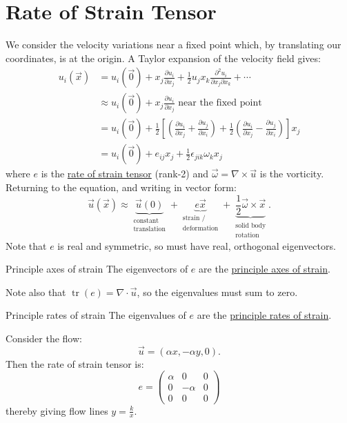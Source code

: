\documentclass[../Main.tex]{subfiles}
\begin{document}
\section{Rate of Strain Tensor}
We consider the velocity variations near a fixed point which, by translating our coordinates, is at the origin. A Taylor expansion of the velocity field gives:
\begin{align*}
    u_i(\vec{x}) &= u_i(\vec0) + x_j \frac{\partial u_i}{\partial x_j} + \frac12 u_j x_k \frac{\partial^{2}u_i}{\partial x_j\partial x_k} + \cdots \\
    &\approx u_i(\vec0) + x_j \frac{\partial u_i}{\partial x_j} \text{ near the fixed point} \\
    &= u_i(\vec0) + \frac12 \left[\left(\frac{\partial u_i}{\partial x_j} + \frac{\partial u_j}{\partial x_i}\right) + \frac12 \left(\frac{\partial u_i}{\partial x_j} - \frac{\partial u_j}{\partial x_i}\right)\right] x_j \\
    &= u_i(\vec0) + e_{ij}x_j + \frac12 \epsilon_{jik} \omega_k x_j
\end{align*}
where $e$ is the \underline{rate of strain tensor} (rank-2) and $\vec{\omega} = \nabla \times \vec{u}$ is the vorticity. Returning to the equation, and writing in vector form:
\begin{equation*}
    \vec{u}(\vec{x}) \approx \underbrace{\vec{u}(0)}_{\substack{\text{constant}\\\text{translation}}} + \underbrace{e \vec{x}}_{\substack{\text{strain /}\\\text{deformation}}} + \underbrace{\frac12 \vec{\omega} \times \vec{x}}_{\substack{\text{solid body}\\\text{rotation}}}.
\end{equation*}
Note that $e$ is real and symmetric, so must have real, orthogonal eigenvectors.
\begin{definition}{Principle axes of strain}
    The eigenvectors of $e$ are the \underline{principle axes of strain}.
\end{definition}
Note also that $\operatorname{tr}(e) = \nabla \cdot \vec{u}$, so the eigenvalues must sum to zero.
\begin{definition}{Principle rates of strain}
    The eigenvalues of $e$ are the \underline{principle rates of strain}.
\end{definition}
\begin{example}
    Consider the flow:
    \begin{equation*}
        \vec{u} = \left(\alpha x, -\alpha y, 0\right).
    \end{equation*}
    Then the rate of strain tensor is:
    \begin{equation*}
        e =
        \begin{pmatrix}
            \alpha & 0 & 0 \\
            0 & -\alpha & 0 \\
            0 & 0 & 0
        \end{pmatrix}
    \end{equation*}
    thereby giving flow lines $y = \frac{k}{x}$.
\end{example}
\end{document}
